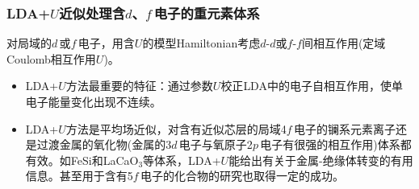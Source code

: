 \frame
{
\frametitle{LDA+$U$近似处理含$d$、$f$\,电子的重元素体系}
对局域的$d$\,或$f$\,电子，用含\textrm{$U$}的模型\textrm{Hamiltonian}考虑$d$-$d$或$f$-$f$间相互作用(定域\textrm{Coulomb}相互作用\textrm{$U$})。%
\begin{itemize}
\setlength{\itemsep}{10pt}
	\item \textrm{LDA+$U$}方法最重要的特征：通过参数\textrm{$U$}校正\textrm{LDA}中的电子自相互作用，使单电子能量变化出现不连续。%
	\item \textrm{LDA+$U$}方法是平均场近似，对含有近似芯层的局域4$f$\,电子的镧系元素离子还是过渡金属的氧化物(金属的3$d$\,电子与氧原子2$p$\,电子有很强的相互作用)体系都有效。如\textrm{FeSi}和\textrm{LaCaO$_3$}等体系，\textrm{LDA+$U$}能给出有关于金属-绝缘体转变的有用信息。甚至用于含有5$f$\,电子的化合物的研究也取得一定的成功。
\end{itemize}
}

